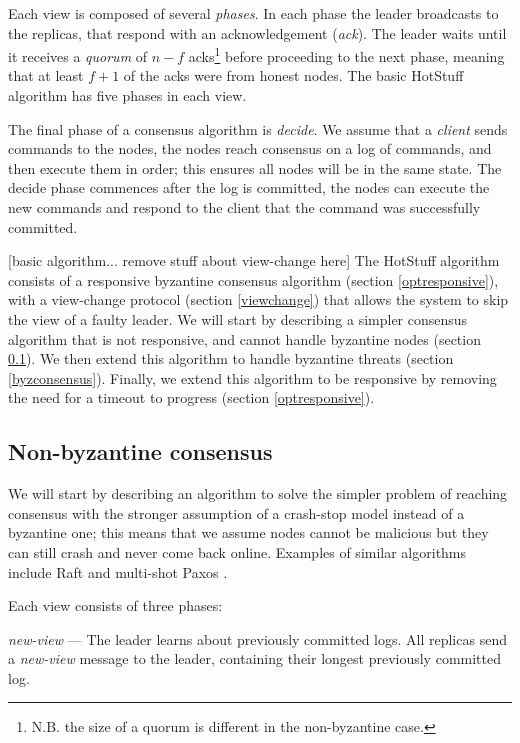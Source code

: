 Each view is composed of several \textit{phases}. In each phase the leader broadcasts to the replicas, that respond with an acknowledgement (\textit{ack}). The leader waits until it receives a \textit{quorum} of $n - f$ acks\footnote{N.B. the size of a quorum is different in the non-byzantine case.} before proceeding to the next phase, meaning that at least $f + 1$ of the acks were from honest nodes. The basic HotStuff algorithm has five phases in each view.

The final phase of a consensus algorithm is \textit{decide}. We assume that a \textit{client} sends commands to the nodes, the nodes reach consensus on a log of commands, and then execute them in order; this ensures all nodes will be in the same state. The decide phase commences after the log is committed, the nodes can execute the new commands and respond to the client that the command was successfully committed.

[basic algorithm... remove stuff about view-change here]
The HotStuff algorithm consists of a responsive byzantine consensus algorithm (section \ref{optresponsive}), with a view-change protocol (section \ref{viewchange}) that allows the system to skip the view of a faulty leader. We will start by describing a simpler consensus algorithm that is not responsive, and cannot handle byzantine nodes (section \ref{nonbyzconsensus}). We then extend this algorithm to handle byzantine threats (section \ref{byzconsensus}). Finally, we extend this algorithm to be responsive by removing the need for a timeout to progress (section \ref{optresponsive}).

\subsection{Non-byzantine consensus} \label{nonbyzconsensus}
We will start by describing an algorithm to solve the simpler problem of reaching consensus with the stronger assumption of a crash-stop model instead of a byzantine one; this means that we assume nodes cannot be malicious but they can still crash and never come back online. Examples of similar algorithms include Raft \cite{ongaro_search_nodate} and multi-shot Paxos \cite{lamport_part-time_1998}\cite{lamport_paxos_2001}.

Each view consists of three phases:

\textit{new-view} --- The leader learns about previously committed logs. All replicas send a \textit{new-view} message to the leader, containing their longest previously committed log.

